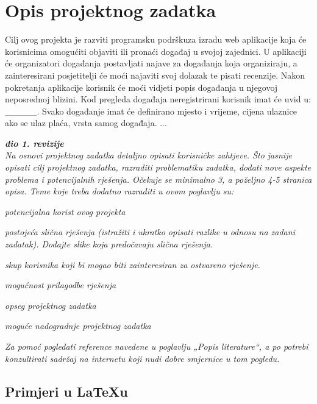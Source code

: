 \chapter{Opis projektnog zadatka}
		\large Cilj ovog projekta je razviti programsku podrškuza izradu web aplikacije
		koja će korisnicima omogućiti objaviti ili pronaći događaj u svojoj zajednici.
		U aplikaciji će organizatori događanja postavljati najave za događanja koja 				organiziraju, a zainteresirani posjetitelji će moći najaviti svoj dolazak te 
		pisati recenzije. 
			Nakon pokretanja aplikacije korisnik će moći vidjeti popis događanja u njegovoj 
		neposrednoj blizini. Kod pregleda događaja neregistrirani korisnik imat će uvid u:
		_____. Svako događanje imat će definirano mjesto i vrijeme, cijena ulaznice ako se 			ulaz plaća, vrsta samog događaja. ...
			
		
		\textbf{\textit{dio 1. revizije}}\\
		
		\textit{Na osnovi projektnog zadatka detaljno opisati korisničke zahtjeve. Što jasnije opisati cilj projektnog zadatka, razraditi problematiku zadatka, dodati nove aspekte problema i potencijalnih rješenja. Očekuje se minimalno 3, a poželjno 4-5 stranica opisa.	Teme koje treba dodatno razraditi u ovom poglavlju su:}
		\begin{packed_item}
			\item \textit{potencijalna korist ovog projekta}
			\item \textit{postojeća slična rješenja (istražiti i ukratko opisati razlike u odnosu na zadani zadatak). Dodajte slike koja predočavaju slična rješenja.}
			\item \textit{skup korisnika koji bi mogao biti zainteresiran za ostvareno rješenje.}
			\item \textit{mogućnost prilagodbe rješenja }
			\item \textit{opseg projektnog zadatka}
			\item \textit{moguće nadogradnje projektnog zadatka}
		\end{packed_item}
		
		\textit{Za pomoć pogledati reference navedene u poglavlju „Popis literature“, a po potrebi konzultirati sadržaj na internetu koji nudi dobre smjernice u tom pogledu.}
		\eject
		
		\section{Primjeri u \LaTeX u}
		
